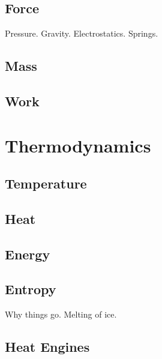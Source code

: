 \documentclass[main.tex]{subfiles}
\begin{document}
\chapter{Force}
Pressure. Gravity. Electrostatics. Springs.
\chapter{Mass}
\chapter{Work}
\part{Thermodynamics}
\chapter{Temperature}
\chapter{Heat}
\chapter{Energy}
\chapter{Entropy}
Why things go. Melting of ice.
\chapter{Heat Engines}
\end{document}
